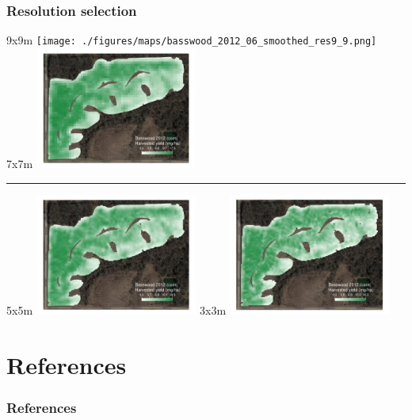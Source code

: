 \documentclass{beamer}
\begin{document}
\begin{frame}
  \frametitle{Resolution selection}

  \scriptsize{9x9m} \texttt{[image: ./figures/maps/basswood\_2012\_06\_smoothed\_res9\_9.png]}
  \scriptsize{7x7m} \includegraphics[width=0.4\textwidth]{./figures/maps/basswood_2012_06_smoothed_res7_7.png}

  \vspace{10px}
  \hrule
  \scriptsize{5x5m} \includegraphics[width=0.4\textwidth]{./figures/maps/basswood_2012_06_smoothed_res5_5.png}
  \scriptsize{3x3m} \includegraphics[width=0.4\textwidth]{./figures/maps/basswood_2012_06_smoothed_res3_3.png}
  
  
\end{frame}


\section{References}

\begin{frame}
  \frametitle{References}

  
\end{frame}
\end{document}
